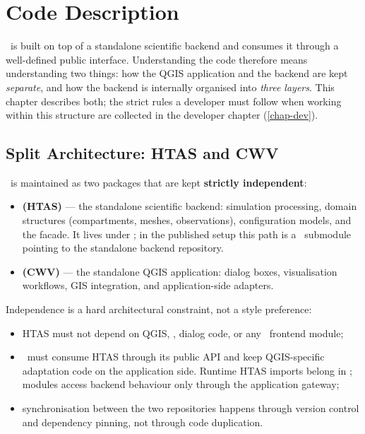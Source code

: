 \chapter{Code Description}
\label{chap-description-src}

\renewcommand{\headrulewidth}{0.3pt}
\fancyhead[LE]{\thepage} \fancyhead[RE]{\nouppercase{\textbf{\leftmark}}}
\fancyhead[RO]{\thepage} \fancyhead[LO]{\nouppercase{\textbf{\rightmark}}}
\fancyfoot[L,C,R]{}

\setlength{\parindent}{0.35cm}

\minitoc
\newpage

\cwv~is built on top of a standalone scientific backend and consumes it through a well-defined public interface. Understanding the code therefore means understanding two things: how the QGIS application and the backend are kept \emph{separate}, and how the backend is internally organised into \emph{three layers}. This chapter describes both; the strict rules a developer must follow when working within this structure are collected in the developer chapter (\cref{chap-dev}).

\section{Split Architecture: HTAS and CWV}
\label{sec-split}

\cwv~is maintained as two packages that are kept \textbf{strictly independent}:

\begin{itemize}
    \item \textbf{ (HTAS)} --- the standalone scientific backend: simulation processing, domain structures (compartments, meshes, observations), configuration models, and the  facade. It lives under ; in the published setup this path is a \gitlab~submodule pointing to the standalone backend repository.
    \item \textbf{ (CWV)} --- the standalone QGIS application: dialog boxes, visualisation workflows, GIS integration, and application-side adapters.
\end{itemize}

Independence is a hard architectural constraint, not a style preference:

\begin{itemize}
    \item HTAS must not depend on QGIS, , dialog code, or any \cwv~frontend module;
    \item \cwv~must consume HTAS through its public API and keep QGIS-specific adaptation code on the application side. Runtime HTAS imports belong in ;  modules access backend behaviour only through the application gateway;
    \item synchronisation between the two repositories happens through version control and dependency pinning, not through code duplication.
\end{itemize}


